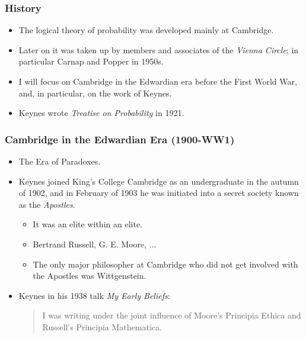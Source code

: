 \documentclass[usenames,dvipsnames, 10pt]{beamer}
\begin{document}
\begin{frame}
	\frametitle{History}
	\begin{itemize}
		\item The logical theory of probability was developed mainly at Cambridge.
		\pause
		\item Later on it was taken up by members
		and associates of the \emph{Vienna Circle}; in particular Carnap and Popper in 1950s.
		\pause
		\item I will focus on Cambridge in the Edwardian era before the First World War, and, in particular, on the work of Keynes.
		\pause
		\item Keynes wrote \emph{Treatise on Probability} in 1921.
	\end{itemize}
\end{frame}

\begin{frame}
	\frametitle{Cambridge in the Edwardian Era {\small (1900-WW1)}}
	\begin{itemize}
		
		\item The Era of Paradoxes.
		\pause
		\item Keynes joined King’s College Cambridge as an undergraduate in the autumn
		of 1902, and in February of 1903 he was initiated into a secret society known as
		the \emph{Apostles}.
		\begin{itemize}
			\item It was an elite within an elite.
			\item Bertrand Russell, G. E. Moore, ...
			\item The only major philosopher at Cambridge who did not get involved with the Apostles was Wittgenstein.
		\end{itemize}
		\pause
		\item Keynes in his 1938 talk \emph{My Early Beliefs}:
		
		\begin{quote}
			I was writing under the joint influence of Moore’s Principia Ethica and Russell’s Principia	Mathematica.
		\end{quote}
		
		
		
		
		

	\end{itemize}
\end{frame}
\end{document}
